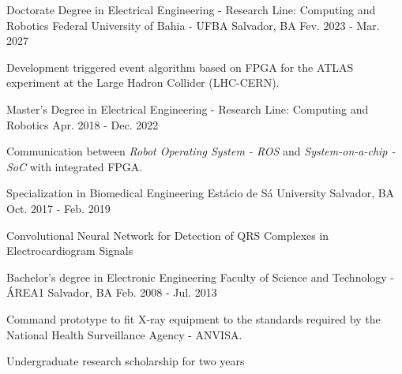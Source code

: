 

\begin{cventries}

  \cventry
    {Doctorate Degree in Electrical Engineering - Research Line: Computing and Robotics} %
    {Federal University of Bahia - UFBA} %
    {Salvador, BA} %
    {Fev. 2023 - Mar. 2027} %
    {
      \begin{cvitems} %
        \item {Development triggered event algorithm based on FPGA for the ATLAS experiment at the Large Hadron Collider (LHC-CERN).}
      \end{cvitems}
    }


  \cventry
    {Master's Degree in Electrical Engineering - Research Line: Computing and Robotics} %
    {} %
    {} %
    {Apr. 2018 - Dec. 2022} %
    {
      \begin{cvitems} %
        \item {Communication between \textit{Robot Operating System - ROS} and \textit{System-on-a-chip - SoC} with integrated FPGA.}
      \end{cvitems}
    }


  \cventry
    {Specialization in Biomedical Engineering} %
    {Estácio de Sá University} %
    {Salvador, BA} %
    {Oct. 2017 - Feb. 2019} %
    {
      \begin{cvitems} %
        \item {Convolutional Neural Network for Detection of QRS Complexes in Electrocardiogram Signals}
      \end{cvitems}
    }


  \cventry
    {Bachelor's degree in Electronic Engineering} %
    {Faculty of Science and Technology - ÁREA1} %
    {Salvador, BA} %
    {Feb. 2008 - Jul. 2013} %
    {
      \begin{cvitems} %
        \item {Command prototype to fit X-ray equipment to the standards required by the National Health Surveillance Agency - ANVISA.}
        \item {Undergraduate research scholarship for two years}
      \end{cvitems}
    }

\end{cventries}
